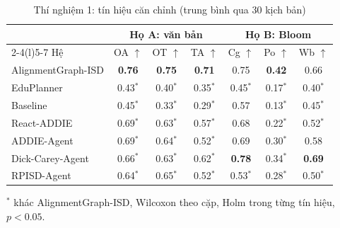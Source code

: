 \begin{table}[t]
  \caption{Thí nghiệm 1: tín hiệu căn chỉnh (trung bình qua 30 kịch bản)}
  \label{tab:panel}
  \centering
  \footnotesize
  \setlength{\tabcolsep}{3pt}
  \begin{tabular}{@{}lcccccc@{}}
    \toprule
    & \multicolumn{3}{c}{Họ A: văn bản} & \multicolumn{3}{c}{Họ B: Bloom} \\
    \cmidrule(lr){2-4}\cmidrule(l){5-7}
    Hệ & OA $\uparrow$ & OT $\uparrow$ & TA $\uparrow$ & Cg $\uparrow$ & Po $\uparrow$ & Wb $\uparrow$ \\
    \midrule
    AlignmentGraph-ISD & \textbf{0.76} & \textbf{0.75} & \textbf{0.71} & 0.75 & \textbf{0.42} & 0.66 \\
    EduPlanner & 0.43$^{*}$ & 0.40$^{*}$ & 0.35$^{*}$ & 0.45$^{*}$ & 0.17$^{*}$ & 0.40$^{*}$ \\
    Baseline & 0.45$^{*}$ & 0.33$^{*}$ & 0.29$^{*}$ & 0.57 & 0.13$^{*}$ & 0.45$^{*}$ \\
    React-ADDIE & 0.69$^{*}$ & 0.63$^{*}$ & 0.57$^{*}$ & 0.68 & 0.22$^{*}$ & 0.52$^{*}$ \\
    ADDIE-Agent & 0.69$^{*}$ & 0.64$^{*}$ & 0.52$^{*}$ & 0.69 & 0.30$^{*}$ & 0.58 \\
    Dick-Carey-Agent & 0.66$^{*}$ & 0.63$^{*}$ & 0.62$^{*}$ & \textbf{0.78} & 0.34$^{*}$ & \textbf{0.69} \\
    RPISD-Agent & 0.64$^{*}$ & 0.65$^{*}$ & 0.52$^{*}$ & 0.53$^{*}$ & 0.28$^{*}$ & 0.50$^{*}$ \\
    \bottomrule
  \end{tabular}
  \par\vspace{2pt}
  {\scriptsize\raggedright $^{*}$ khác AlignmentGraph-ISD, Wilcoxon theo cặp, Holm trong từng tín hiệu, $p<0.05$.\par}
\end{table}
